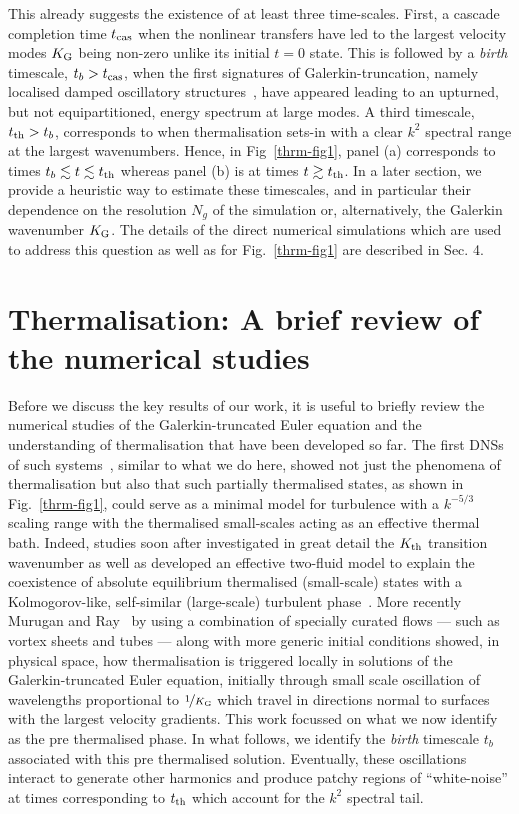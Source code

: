 \documentclass[../Rajarshi-thesis-draft.tex]{subfiles}
\begin{document}
This already suggests the existence of at least three time-scales. First, a cascade
completion time $t_{\rm cas}$ when the nonlinear transfers have led to the largest velocity modes $K_{\rm G}$
being non-zero unlike its initial $t = 0$ state. This is followed by a \textit{birth} timescale, $t_b > t_{\rm cas}$, when the first signatures of Galerkin-truncation, namely localised damped oscillatory structures~\cite{MuruganRay2023},
have appeared leading to an upturned, but not equipartitioned, energy spectrum at large modes.
A third timescale, $t_{\rm th} > t_b$, corresponds to when thermalisation sets-in with a clear $k^2$ spectral
range at the largest wavenumbers. Hence, in Fig~\ref{thrm-fig1}, panel (a) corresponds to times
$t_b \lesssim t \lesssim t_{\rm th}$ whereas panel (b) is at times $t \gtrsim t_{\rm th}$.
In a later section, we provide a heuristic way to estimate these timescales, and in particular their
dependence on the resolution $N_g$ of the simulation or, alternatively, the Galerkin wavenumber $K_{\rm G}$.
{The details of the direct numerical simulations which are used to address this question as well
as for Fig.~\ref{thrm-fig1} are described in Sec. 4.}

\section{Thermalisation: A brief review of the numerical studies}

Before we discuss the key results of our work, it is useful to briefly review
the numerical studies of the Galerkin-truncated Euler equation and the
understanding of thermalisation that have been developed so far.  The first
DNSs of such systems~\cite{Cichowlasetal2005}, similar to what we do here,
showed not just the phenomena of thermalisation but also that such partially
thermalised states, as shown in Fig.~\ref{thrm-fig1}, could serve as a
minimal model for turbulence with a $k^{-5/3}$ scaling range with the
thermalised small-scales acting as an effective thermal bath. Indeed, studies
soon after investigated in great detail the $K_{\rm th}$ transition wavenumber
as well as developed an effective two-fluid model to explain the coexistence of
absolute equilibrium thermalised (small-scale) states with a Kolmogorov-like,
self-similar (large-scale) turbulent
phase~\cite{BosBertoglio2006,KrstulovicBrachet2008,Krstulovicetal2009,Molfettaetal2015,MKV2023}.
More recently Murugan and Ray~\cite{MuruganRay2023} by using a combination of
specially curated flows --- such as vortex sheets and tubes --- along with more
generic initial conditions showed, in physical space, how thermalisation is
triggered locally in solutions of the Galerkin-truncated Euler equation, initially through small scale oscillation of wavelengths proportional to
$\nicefrac{1}{K_{\rm G}}$ which travel in directions normal to surfaces with
the largest velocity gradients. This work focussed on what we now identify as the pre thermalised phase.
In what follows, we identify the \textit{birth}
timescale $t_b$ associated with this pre thermalised solution. Eventually, these oscillations
interact to generate other harmonics and produce patchy regions of ``white-noise'' at times corresponding to $t_{\rm th}$ which account for the $k^2$
spectral tail.
\end{document}
